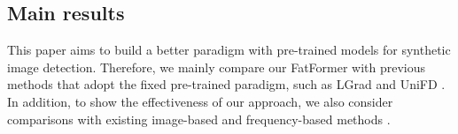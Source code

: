 \documentclass[10pt,twocolumn,letterpaper]{article}
\begin{document}
\subsection{Main results}
This paper aims to build a better paradigm with pre-trained models for synthetic image detection. Therefore, we mainly compare our FatFormer with previous methods that adopt the fixed pre-trained paradigm, such as LGrad \cite{tan2023learning} and UniFD \cite{ojha2023towards}. In addition, to show the effectiveness of our approach, we also consider comparisons with existing image-based \cite{wang2020cnn,chai2020makes,shiohara2022detecting} and frequency-based methods \cite{durall2020watch,frank2020leveraging,qian2020thinking,jeong2022bihpf,jeong2022frepgan}.


\end{document}
